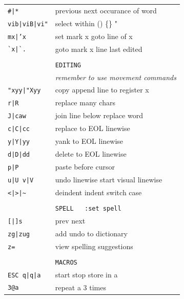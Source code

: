 \documentclass[a4paper,12pt]{article}
\begin{document}
\begin{multicols}{2}
\begin{tabular}{ll}
\texttt{\#|*}& previous \textbar{} next occurance of word\\
\texttt{vib|viB|vi"}&select within () \textbar{} \{\} \textbar{} " \\
\texttt{mx|'x}&set mark x \textbar{} goto line of x\\
\texttt{\`{}x|\`{}.}&goto mark x \textbar{} line last edited\\
\\
&\texttt{EDITING}\\
&\emph{remember to use movement commands}\\
\texttt{"xyy|"Xyy}&copy \textbar{} append line to register x\\
\texttt{r|R}& replace \textbar{} many chars\\
\texttt{J|caw}& join line below \textbar{} replace word\\
\texttt{c|C|cc}& replace \textbar{} to EOL \textbar{} linewise\\
\texttt{y|Y|yy}& yank \textbar{} to EOL \textbar{} linewise\\
\texttt{d|D|dd}& delete \textbar{} to EOL \textbar{} linewise\\
\texttt{p|P}& paste \textbar{} before cursor\\
\texttt{u|U v|V}& undo \textbar{} linewise start visual \textbar{} linewise\\
\texttt{<|>|\~}& deindent \textbar{} indent \textbar{} switch case\\
\\
&\texttt{SPELL\ \ \ :set spell}\\
\texttt{[|]s}&prev \textbar{} next\\
\texttt{zg|zug}&add \textbar{} undo to dictionary\\
\texttt{z=}&view spelling suggestions\\
\\
&\texttt{MACROS}\\
\texttt{ESC q|q|a}&start \textbar{} stop \textbar{} store in a\\
\texttt{3@a}&repeat a 3 times\\
\end{tabular}

\vfill


\end{multicols}
\end{document}
